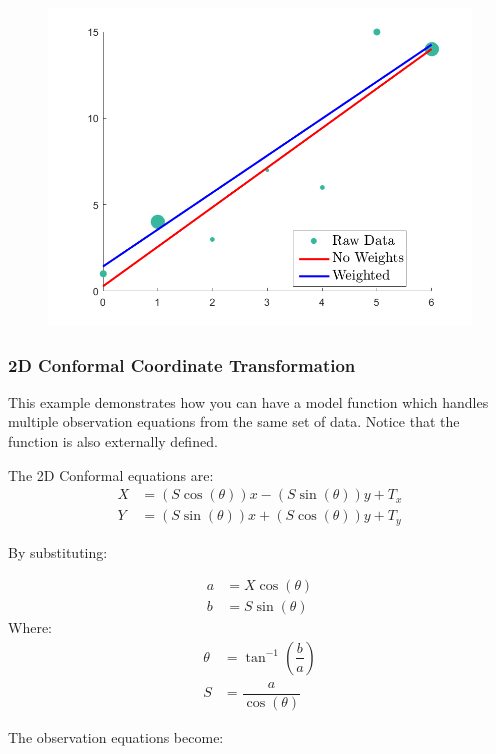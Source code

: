 \documentclass{article}
\begin{document}
	\begin{figure}[H]
		\centering
		\includegraphics[width = \linewidth]{weights}
	\end{figure}
	
	\clearpage
	\subsubsection*{2D Conformal Coordinate Transformation}
	This example demonstrates how you can have a model function which handles multiple observation equations from the same set of data.  Notice that the function is also externally defined.
	
	\vspace{0.25cm}
	\noindent
	The 2D Conformal equations are:
	\begin{align*}
	X &= (S\cos(\theta))x - (S\sin(\theta))y + T_x \\
	Y &= (S\sin(\theta))x + (S\cos(\theta))y + T_y
	\end{align*}
	
	\noindent
	By substituting: 
	
	\begin{align*}
	a &= X\cos(\theta) \\
	b &= S\sin(\theta)
	\end{align*}
	Where:
	\begin{align*}
	\theta &= \tan^{-1}(\dfrac{b}{a}) \\
	S &= \dfrac{a}{\cos(\theta)}
	\end{align*}
	
	\noindent
	The observation equations become:
	
\end{document}
